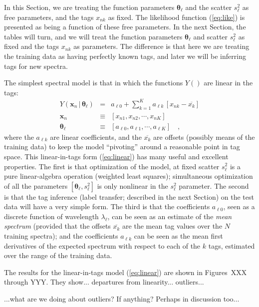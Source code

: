\documentclass[12pt, preprint]{aastex}
\newcommand{\sectionname}{Section}
\newcommand{\set}[1]{\bm{#1}}
\newcommand{\mean}[1]{\overline{#1}}
\newcommand{\given}{\,|\,}
\begin{document}
In this \sectionname, we are treating the function parameters
$\set{\theta}_\ell$ and the scatter $s_\ell^2$ as free parameters, and the
tags $x_{nk}$ as fixed.
The likelihood function (\ref{eq:like}) is presented as being a
function of these free parameters.
In the next \sectionname, the tables will turn, and we will treat the
function parameters $\set{\theta}_\ell$ and scatter $s_\ell^2$ as fixed and
the tags $x_{nk}$ as parameters.
The difference is that here we are treating the training data as
having perfectly known tags, and later we will be inferring tags for
new spectra.

The simplest spectral model is that in which the functions $Y()$ are
linear in the tags:
\begin{eqnarray}
Y(\set{x}_n\given\set{\theta}_\ell) &=&
 a_{\ell 0} + \sum_{k=1}^K a_{\ell k}\,[x_{nk} - \mean{x_k}]
\label{eq:linear}\\
\set{x}_n &\equiv& [x_{n1}, x_{n2}, \cdots, x_{nK}]
\\
\set{\theta}_\ell &\equiv& [a_{\ell 0}, a_{\ell 1}, \cdots, a_{\ell K}]
\quad ,
\end{eqnarray}
where the $a_{\ell k}$ are linear coefficients, and
the $\mean{x_k}$ are offsets (possibly means of the training data) to
keep the model ``pivoting'' around a reasonable point in tag space.
This linear-in-tags form (\ref{eq:linear}) has many useful and
excellent properties.
The first is that optimization of the model, at fixed scatter
$s_\ell^2$ is a pure linear-algebra operation (weighted least
squares); simultaneous optimization of all the parameters
$[\set{\theta}_\ell,s_\ell^2]$ is only nonlinear in the $s_\ell^2$
parameter.
The second is that the tag inference (label transfer; described in the
next Section) on the test data will have a very simple form.
The third is that the coefficients $a_{\ell 0}$, seen as a discrete
function of wavelength $\lambda_\ell$, can be seen as an estimate of
the \emph{mean spectrum} (provided that the offsets $\mean{x_k}$ are
the mean tag values over the $N$ training spectra); and the
coefficients $a_{\ell k}$ can be seen as the mean first derivatives of
the expected spectrum with respect to each of the $k$ tags, estimated
over the range of the training data.

The results for the linear-in-tags model (\ref{eq:linear}) are shown
in Figures~XXX through YYY.  They show... departures from
linearity... outliers...

...what are we doing about outliers?  If anything?  Perhaps in discussion too...
\end{document}
